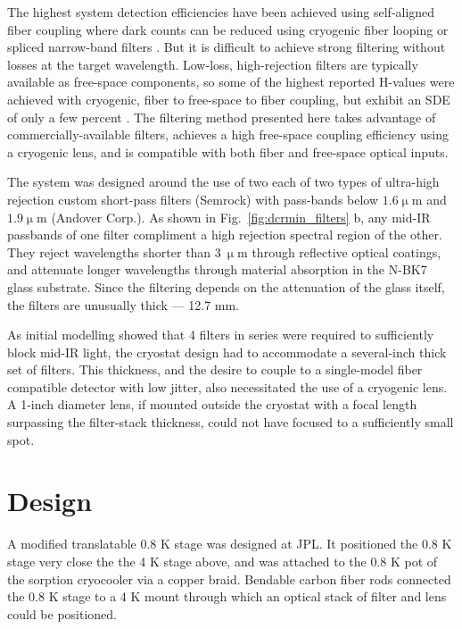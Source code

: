 \documentclass[11pt]{caltech_thesis} %
\begin{document}
The highest system detection efficiencies have been achieved using self-aligned fiber coupling where dark counts can be reduced using cryogenic fiber looping \autocite{Cohen2015} or spliced narrow-band filters \autocite{Boaron2018secure}. But it is difficult to achieve strong filtering without losses at the target wavelength. Low-loss, high-rejection filters are typically available as free-space components, so some of the highest reported H-values were achieved with cryogenic, fiber to free-space to fiber coupling, but exhibit an SDE of only a few percent \autocite{Shibata2015}. The filtering method presented here takes advantage of commercially-available filters, achieves a high free-space coupling efficiency using a cryogenic lens, and is compatible with both fiber and free-space optical inputs.

The system was designed around the use of two each of two types of ultra-high rejection custom short-pass filters (Semrock) with pass-bands below $1.6 \mathrm{\upmu m}$ and $1.9 \mathrm{\upmu m}$ (Andover Corp.). As shown in Fig.~\ref{fig:dcrmin_filters} b, any mid-IR passbands of one filter compliment a high rejection spectral region of the other. They reject wavelengths shorter than $3 \ \mathrm{\upmu m}$ through reflective optical coatings, and attenuate longer wavelengths through material absorption in the N-BK7 glass substrate. Since the filtering depends on the attenuation of the glass itself, the filters are unusually thick --- 12.7 mm.

As initial modelling showed that 4 filters in series were required to sufficiently block mid-IR light, the cryostat design had to accommodate a several-inch thick set of filters. This thickness, and the desire to couple to a single-model fiber compatible detector with low jitter, also necessitated the use of a cryogenic lens. A 1-inch diameter lens, if mounted outside the cryostat with a focal length surpassing the filter-stack thickness, could not have focused to a sufficiently small spot.

\hypertarget{design}{%
\section{Design}\label{design}}

A modified translatable 0.8 K stage was designed at JPL. It positioned the 0.8 K stage very close the the 4 K stage above, and was attached to the 0.8 K pot of the sorption cryocooler via a copper braid. Bendable carbon fiber rods connected the 0.8 K stage to a 4 K mount through which an optical stack of filter and lens could be positioned.
\end{document}

